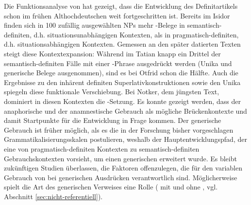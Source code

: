 Die Funktionsanalyse von  hat gezeigt, dass die Entwicklung des Definitartikels  schon im frühen Althochdeutschen weit fortgeschritten ist. Bereits im Isidor finden sich in 100 zufällig ausgewählten NPs mehr -Belege in  semantisch-definiten, d.h. situationsunabhängigen Kontexten, als in  pragmatisch-definiten, d.h. situationsabhängigen Kontexten. Gemessen an den später datierten Texten steigt diese  Kontextexpansion: Während im Tatian knapp ein Drittel der se\-man\-tisch-definiten  Fälle mit einer -Phrase ausgedrückt werden (Unika  und generische Belege  ausgenommen), sind es bei Otfrid schon die Hälfte. Auch die Ergebnisse zu den inhärent definiten Superlativkonstruktionen  sowie den Unika  spiegeln diese funktionale Verschiebung. Bei Notker, dem jüngsten Text, dominiert in diesen Kontexten die -Setzung. Es konnte gezeigt werden, dass der anaphorische  und der anamnestische  Gebrauch als mögliche Brückenkontexte  und damit Startpunkte für die Entwicklung in Frage kommen. Der generische  Gebrauch ist früher möglich, als es die in der Forschung bisher vorgeschlagen Grammatikalisierungsskalen  postulieren, weshalb der Hauptentwicklungspfad, der eine  von pragmatisch-definiten  Kontexten zu semantisch-definiten Gebrauchskontexten  vorsieht, um einen generischen   erweitert wurde. Es bleibt zukünftigen Studien überlassen, die Faktoren offenzulegen, die für den variablen Gebrauch von  bei generischen  Ausdrücken verantwortlich sind. Möglicherweise spielt die Art des generischen  Verweises eine Rolle ( mit und ohne , vgl. Abschnitt \ref{sec:nicht-referentiell}). 

